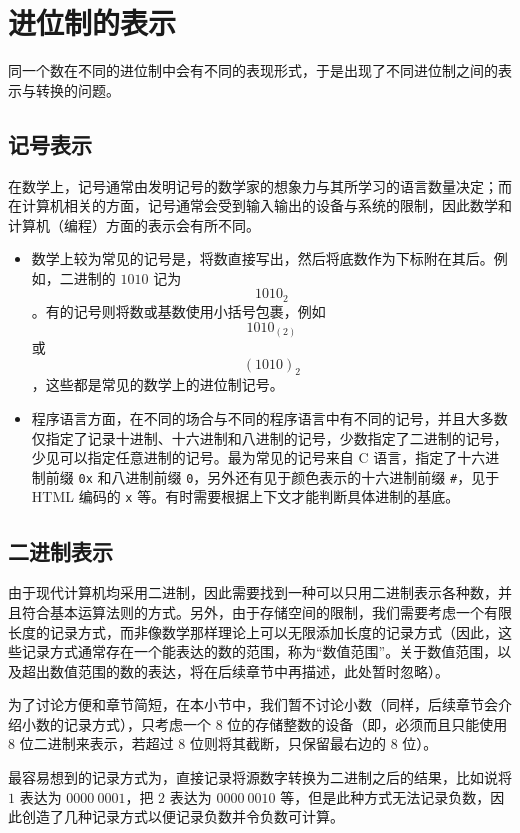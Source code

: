 \section{进位制的表示}\label{sec:NumberSystemBasics/positional-notation-presentation}
    同一个数在不同的进位制中会有不同的表现形式，于是出现了不同进位制之间的表示与转换的问题。
    \subsection{记号表示}\label{subsec:NumberSystemBasics/positional-notation-presentation/natural}
        在数学上，记号通常由发明记号的数学家的想象力与其所学习的语言数量决定；而在计算机相关的方面，记号通常会受到输入输出的设备与系统的限制，因此数学和计算机（编程）方面的表示会有所不同。
        \begin{itemize}
            \item 数学上较为常见的记号是，将数直接写出，然后将底数作为下标附在其后。例如，二进制的 $1010$ 记为\[1010_2\]。有的记号则将数或基数使用小括号包裹，例如\[1010_{(2)}\]或\[(1010)_2\]，这些都是常见的数学上的进位制记号。
            \item 程序语言方面，在不同的场合与不同的程序语言中有不同的记号，并且大多数仅指定了记录十进制、十六进制和八进制的记号，少数指定了二进制的记号，少见可以指定任意进制的记号。最为常见的记号来自 C 语言，指定了十六进制前缀 \texttt{0x} 和八进制前缀 \texttt{0}，另外还有见于颜色表示的十六进制前缀 \texttt{\#}，见于 HTML 编码的 \texttt{x} 等。有时需要根据上下文才能判断具体进制的基底。
        \end{itemize}
    \subsection{二进制表示}\label{subsec:NumberSystemBasics/positional-notation-presentation/binary}
        由于现代计算机均采用二进制，因此需要找到一种可以只用二进制表示各种数，并且符合基本运算法则的方式。另外，由于存储空间的限制，我们需要考虑一个有限长度的记录方式，而非像数学那样理论上可以无限添加长度的记录方式（因此，这些记录方式通常存在一个能表达的数的范围，称为“数值范围”。关于数值范围，以及超出数值范围的数的表达，将在后续章节中再描述，此处暂时忽略）。

        为了讨论方便和章节简短，在本小节中，我们暂不讨论小数（同样，后续章节会介绍小数的记录方式），只考虑一个 $8$ 位的存储整数的设备（即，必须而且只能使用 $8$ 位二进制来表示，若超过 $8$ 位则将其截断，只保留最右边的 $8$ 位）。

        最容易想到的记录方式为，直接记录将源数字转换为二进制之后的结果，比如说将 $1$ 表达为 $0000\ 0001$，把 $2$ 表达为 $0000\ 0010$ 等，但是此种方式无法记录负数，因此创造了几种记录方式以便记录负数并令负数可计算。
